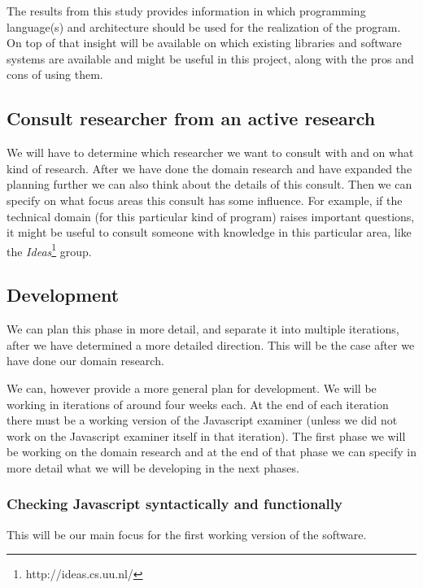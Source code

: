 \documentclass{article}
\begin{document}
The results from this study provides information in which programming
language(s) and architecture should be used for the realization of the
program. On top of that insight will be available on which existing libraries
and software systems are available and might be useful in this project, along
with the pros and cons of using them.

\subsection{Consult researcher from an active research}
We will have to determine which researcher we want to consult with and on what
kind of research. After we have done the domain research and have expanded the
planning further we can also think about the details of this consult. Then we
can specify on what focus areas this consult has some influence. For example,
if the technical domain (for this particular kind of program) raises important
questions, it might be useful to consult someone with knowledge in this
particular area, like the {\em Ideas}\footnote{http://ideas.cs.uu.nl/} group.

\subsection{Development}
We can plan this phase in more detail, and separate it into multiple iterations,
after we have determined a more detailed direction. This will be the case after
we have done our domain research.

We can, however provide a more general plan for development. We will be working
in iterations of around four weeks each. At the end of each iteration there must be a
working version of the Javascript examiner (unless we did not work on the
Javascript examiner itself in that iteration). The first phase we will be working
on the domain research and at the end of that phase we can specify in more
detail what we will be developing in the next phases.

\subsubsection{Checking Javascript syntactically and functionally}
This will be our main focus for the first working version of the software.
\end{document}
